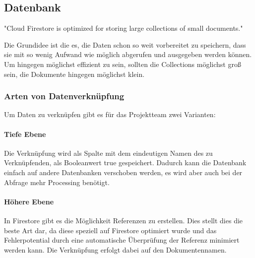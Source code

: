 \subsection{Datenbank}

"Cloud Firestore is optimized for storing large collections of small documents." 

Die Grundidee ist die es, die Daten schon so weit vorbereitet zu speichern, dass sie mit so wenig Aufwand wie möglich abgerufen und ausgegeben werden können. Um hingegen möglichst effizient zu sein, sollten die Collections möglichst groß sein, die Dokumente hingegen möglichst klein.

\subsubsection{Arten von Datenverknüpfung}

Um Daten zu verknüpfen gibt es für das Projektteam zwei Varianten:

\paragraph{Tiefe Ebene}
Die Verknüpfung wird als Spalte mit dem eindeutigen Namen des zu Verknüpfenden, als Booleanwert true gespeichert.  Dadurch kann die Datenbank einfach auf andere Datenbanken verschoben werden, es wird aber auch bei der Abfrage mehr Processing benötigt.

\paragraph{Höhere Ebene}
In Firestore gibt es die Möglichkeit Referenzen zu erstellen. Dies stellt dies die beste Art dar, da diese speziell auf Firestore optimiert wurde und das Fehlerpotential durch eine automatische Überprüfung der Referenz minimiert werden kann. Die Verknüpfung erfolgt dabei auf den Dokumentennamen.
